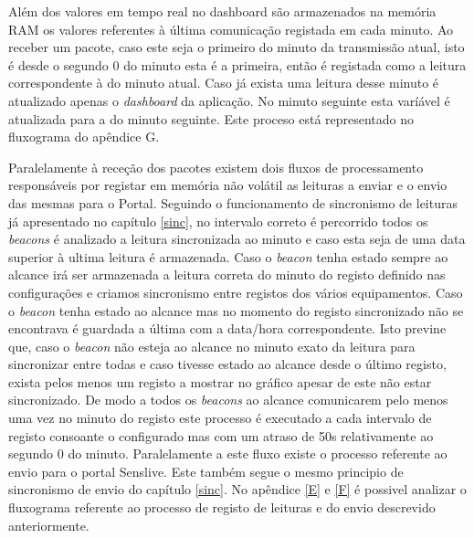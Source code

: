 \par Além dos valores em tempo real no dashboard são armazenados na memória RAM os valores referentes à última comunicação registada em cada minuto. Ao receber um pacote, caso este seja o primeiro do minuto da transmissão atual, isto é desde o segundo 0 do minuto esta é a primeira, então é registada como a leitura correspondente à do minuto atual. Caso já exista uma leitura desse minuto é atualizado apenas o \textit{dashboard} da aplicação. No minuto seguinte esta varíável é atualizada para a do minuto seguinte. Este proceso está representado no fluxograma do apêndice {G}.

\par Paralelamente à receção dos pacotes existem dois fluxos de processamento responsáveis por registar em memória não volátil as leituras a enviar e o envio das mesmas para o Portal. Seguindo o funcionamento de sincronismo de leituras já apresentado no capítulo \ref{sinc}, no intervalo correto é percorrido todos os \textit{beacons} é analizado a leitura sincronizada ao minuto e caso esta seja de uma data superior à ultima leitura é armazenada. Caso o \textit{beacon} tenha estado sempre ao alcance irá ser armazenada a leitura correta do minuto do registo definido nas configurações e criamos sincronismo entre registos dos vários equipamentos. Caso o \textit{beacon} tenha estado ao alcance mas no momento do registo sincronizado não se encontrava é guardada a última com a data/hora correspondente. Isto previne que, caso o \textit{beacon} não esteja ao alcance no minuto exato da leitura para sincronizar entre todas e caso tivesse estado ao alcance desde o último registo, exista pelos menos um registo a mostrar no gráfico apesar de este não estar sincronizado. De modo a todos os \textit{beacons} ao alcance comunicarem pelo menos uma vez no minuto do registo este processo é executado a cada intervalo de registo consoante o configurado mas com um atraso de 50s relativamente ao segundo 0 do minuto. Paralelamente a este fluxo existe o processo referente ao envio para o portal Senslive. Este também segue o mesmo principio de sincronismo de envio do capítulo \ref{sinc}. No apêndice \ref{E} e \ref{F} é possivel analizar o fluxograma referente ao processo de registo de leituras e do envio descrevido anteriormente.


